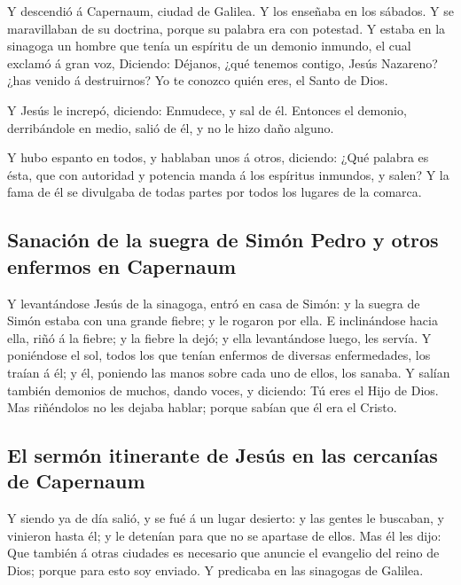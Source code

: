  Y descendió á Capernaum, ciudad de Galilea. Y los
enseñaba en los sábados.  Y se maravillaban de su
doctrina, porque su palabra era con potestad.  Y estaba
en la sinagoga un hombre que tenía un espíritu de un demonio inmundo, el
cual exclamó á gran voz,  Diciendo: Déjanos, ¿qué tenemos
contigo, Jesús Nazareno? ¿has venido á destruirnos? Yo te conozco quién
eres, el Santo de Dios.

 Y Jesús le increpó, diciendo: Enmudece, y sal de él.
Entonces el demonio, derribándole en medio, salió de él, y no le hizo
daño alguno.

 Y hubo espanto en todos, y hablaban unos á otros,
diciendo: ¿Qué palabra es ésta, que con autoridad y potencia manda á los
espíritus inmundos, y salen?  Y la fama de él se
divulgaba de todas partes por todos los lugares de la comarca.

\hypertarget{sanaciuxf3n-de-la-suegra-de-simuxf3n-pedro-y-otros-enfermos-en-capernaum}{%
\subsection{Sanación de la suegra de Simón Pedro y otros enfermos en
Capernaum}\label{sanaciuxf3n-de-la-suegra-de-simuxf3n-pedro-y-otros-enfermos-en-capernaum}}

 Y levantándose Jesús de la sinagoga, entró en casa de
Simón: y la suegra de Simón estaba con una grande fiebre; y le rogaron
por ella.  E inclinándose hacia ella, riñó á la fiebre; y
la fiebre la dejó; y ella levantándose luego, les servía.
 Y poniéndose el sol, todos los que tenían enfermos de
diversas enfermedades, los traían á él; y él, poniendo las manos sobre
cada uno de ellos, los sanaba.  Y salían también demonios
de muchos, dando voces, y diciendo: Tú eres el Hijo de Dios. Mas
riñéndolos no les dejaba hablar; porque sabían que él era el Cristo.

\hypertarget{el-sermuxf3n-itinerante-de-jesuxfas-en-las-cercanuxedas-de-capernaum}{%
\subsection{El sermón itinerante de Jesús en las cercanías de
Capernaum}\label{el-sermuxf3n-itinerante-de-jesuxfas-en-las-cercanuxedas-de-capernaum}}

 Y siendo ya de día salió, y se fué á un lugar desierto:
y las gentes le buscaban, y vinieron hasta él; y le detenían para que no
se apartase de ellos.  Mas él les dijo: Que también á
otras ciudades es necesario que anuncie el evangelio del reino de Dios;
porque para esto soy enviado.  Y predicaba en las
sinagogas de Galilea.

